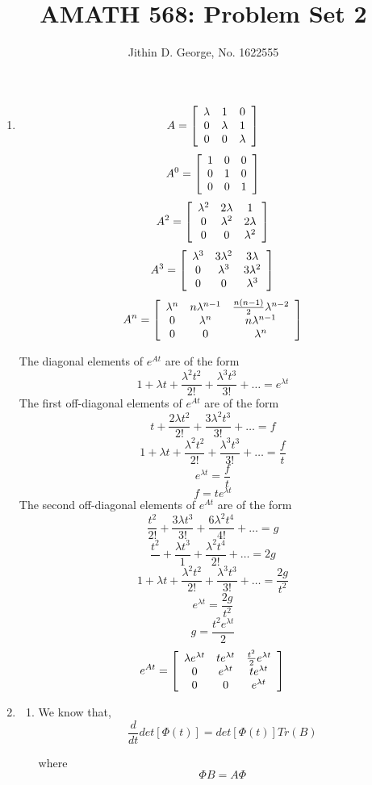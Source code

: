 \documentclass[a4paper]{article}
\title{AMATH 568: Problem Set 2}
\author{Jithin D. George, No. 1622555}
\newenvironment{mat}{\left[ \begin{array}{ccccccccccccc}}{\end{array}\right]}
\newcommand\bcm{\begin{mat}}
\newcommand\ecm{\end{mat}}
\begin{document}
\maketitle
\begin{enumerate}

	
	\item 
\[A = \bcm \lambda &1 &0\\ 0 &\lambda &1\\ 0 &0 &\lambda  \ecm \]
\[A^0 = \bcm 1 &0 &0\\ 0 &1 &0\\ 0 &0 &1  \ecm \]
\[A^2 = \bcm \lambda^2 &2\lambda &1\\ 0 &\lambda^2 &2\lambda\\ 0 &0 &\lambda^2  \ecm \]
\[A^3 = \bcm \lambda^3 &3\lambda^2 &3\lambda\\ 0 &\lambda^3 &3\lambda^2\\ 0 &0 &\lambda^3  \ecm \]
\[A^n = \bcm \lambda^n &n\lambda^{n-1} &\frac{n(n-1)}{2} \lambda^{n-2}\\ 0 &\lambda^n &n\lambda^{n-1}\\ 0 &0 &\lambda^n  \ecm \]

The diagonal elements of $e^{At}$ are of the form
\[1 +\lambda t + \frac{\lambda^2 t^2}{2!}+ \frac{\lambda^3 t^3}{3!} +\ldots = e^{\lambda t}  \]
The  first off-diagonal elements of $e^{At}$ are of the form
\[t + \frac{2 \lambda  t^2}{2!}+ \frac{3\lambda^2 t^3}{3!} +\ldots = f \]
\[1 +\lambda t + \frac{\lambda^2 t^2}{2!}+ \frac{\lambda^3 t^3}{3!} +\ldots = \frac{f}{t}  \]
\[e^{\lambda t}  = \frac{f}{t}  \]
\[f= te^{\lambda t}\]
The  second off-diagonal elements of $e^{At}$ are of the form
\[ \frac{ t^2}{2!}+ \frac{3\lambda t^3}{3!} + \frac{6\lambda^2 t^4}{4!}+\ldots = g \]
\[ \frac{ t^2}{}+ \frac{\lambda t^3}{1} + \frac{\lambda^2 t^4}{2!}+\ldots =2 g \]
\[1 +\lambda t + \frac{\lambda^2 t^2}{2!}+ \frac{\lambda^3 t^3}{3!} +\ldots = \frac{2g}{t^2}  \]
\[e^{\lambda t}  = \frac{2g}{t^2}  \]
\[g= \frac{t^2e^{\lambda t}}{2}\]
\[e^{At} =\bcm \lambda e^{\lambda t} &te^{\lambda t} &\frac{t^2}{2}e^{\lambda t}\\ 0 &e^{\lambda t} &te^{\lambda t}\\ 0 &0 &e^{\lambda t}  \ecm\]


\item
\begin{enumerate}
	\item
	
	We know that,
	\[  \frac{d}{dt} det[\Phi(t)]= det[\Phi(t)] Tr(B)  \]
	
	where
	\[  \Phi B  = A \Phi\]	
	

\end{enumerate}
\end{enumerate}
\end{document}
